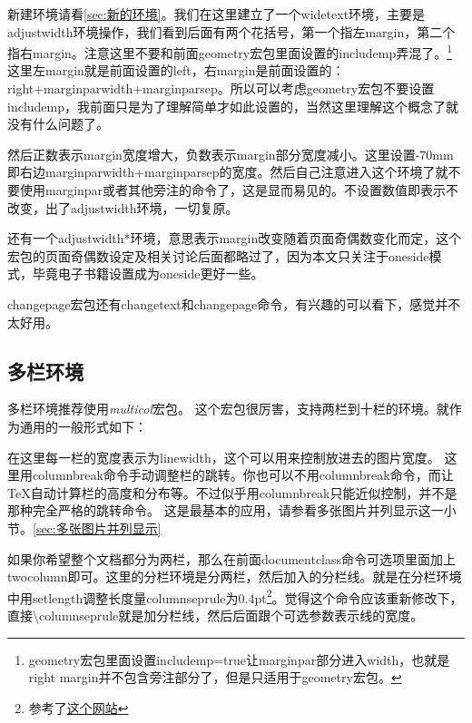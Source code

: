 \documentclass[11pt,oneside]{book}
\begin{document}
\begin{common-format}
新建环境请看\ref{sec:新的环境}。我们在这里建立了一个widetext环境，主要是adjustwidth环境操作，我们看到后面有两个花括号，第一个指左margin，第二个指右margin。注意这里不要和前面geometry宏包里面设置的includemp弄混了。\footnote{geometry宏包里面设置includemp=true让marginpar部分进入width，也就是right margin并不包含旁注部分了，但是只适用于geometry宏包。}这里左margin就是前面设置的left，右margin是前面设置的：\\right+marginparwidth+marginparsep。所以可以考虑geometry宏包不要设置includemp，我前面只是为了理解简单才如此设置的，当然这里理解这个概念了就没有什么问题了。

然后正数表示margin宽度增大，负数表示margin部分宽度减小。这里设置-70mm即右边marginparwidth+marginparsep的宽度。然后自己注意进入这个环境了就不要使用marginpar或者其他旁注的命令了，这是显而易见的。不设置数值即表示不改变，出了adjustwidth环境，一切复原。

还有一个adjustwidth*环境，意思表示margin改变随着页面奇偶数变化而定，这个宏包的页面奇偶数设定及相关讨论后面都略过了，因为本文只关注于oneside模式，毕竟电子书籍设置成为oneside更好一些。

changepage宏包还有changetext和changepage命令，有兴趣的可以看下，感觉并不太好用。


\subsection{多栏环境}
多栏环境推荐使用\emph{multicol}宏包。
这个宏包很厉害，支持两栏到十栏的环境。就作为通用的一般形式如下：

在这里每一栏的宽度表示为linewidth，这个可以用来控制放进去的图片宽度。
这里用columnbreak命令手动调整栏的跳转。你也可以不用columnbreak命令，而让\TeX 自动计算栏的高度和分布等。不过似乎用columnbreak只能近似控制，并不是那种完全严格的跳转命令。
这是最基本的应用，请参看多张图片并列显示这一小节。\ref{sec:多张图片并列显示}



\begin{multicols}{2}
\setlength{\columnseprule}{0.4pt}
如果你希望整个文档都分为两栏，那么在前面documentclass命令可选项里面加上twocolumn即可。这里的分栏环境是分两栏，然后加入的分栏线。就是在分栏环境中用setlength调整长度量columnseprule为0.4pt\footnote{参考了\href{http://texblog.org/tag/columnseprule/}{这个网站}}。觉得这个命令应该重新修改下，直接\textbackslash columnseprule就是加分栏线，然后后面跟个可选参数表示线的宽度。


\end{multicols}
\end{common-format}
\end{document}
